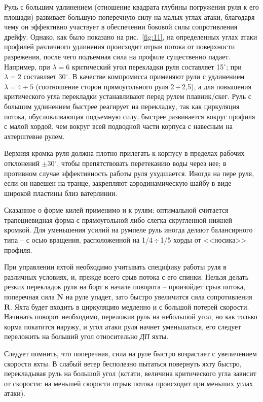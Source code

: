 \documentclass[a4paper, 12pt, twoside, final, book, russian, fittopage, cyremdash]{ncc}
\newcommand{\ve}[1]{\ensuremath{\mathbf{#1}}\xspace}
\newcommand{\gr}{\ensuremath{^\circ}\xspace}
\newcommand{\otdo}{\,\ensuremath{\div}\,}
\newcommand{\motdo}{\div}
\begin{document}
Руль с большим удлинением (отношение квадрата глубины погружения руля к его площади) развивает большую поперечную силу на малых углах атаки, благодаря чему он эффективно участвует в обеспечении боковой силы сопротивления дрейфу. Однако, как было показано на рис.~\ref{fig:11}, на определенных углах атаки профилей различного удлинения происходит отрыв потока от поверхности разрежения, после чего подъемная сила на профиле существенно падает. Например, при $\lambda = 6$ критический угол перекладки руля составляет 15\gr; при $\lambda = 2$ составляет 30\gr. В качестве компромисса применяют рули с удлинением $\lambda = 4 \motdo 5$ (соотношение сторон прямоугольного руля 2\otdo 2,5), а для повышения критического угла перекладки устанавливают перед рулем плавник\-/скег. Руль с большим удлинением быстрее реагирует на перекладку, так как циркуляция потока, обусловливающая подъемную силу, быстрее развивается вокруг профиля с малой хордой, чем вокруг всей подводной части корпуса с навесным на ахтерштевне рулем. 

Верхняя кромка руля должна плотно прилегать к корпусу в пределах рабочих отклонений $\pm 30\gr$, чтобы препятствовать перетеканию воды через нее; в противном случае эффективность работы руля ухудшается. Иногда на пере руля, если он навешен на транце, закрепляют аэродинамическую шайбу в виде широкой пластины близ ватерлинии.

Сказанное о форме килей применимо и к рулям: оптимальной считается трапециевидная форма с прямоугольной либо слегка скругленной нижней кромкой. Для уменьшения усилий на румпеле руль иногда делают балансирного типа \--- с осью вращения, расположенной на 1/4\otdo 1/5 хорды от <<носика>> профиля.

При управлении яхтой необходимо учитывать специфику работы руля в различных условиях, и, прежде всего срыв потока с его спинки. Нельзя делать резких перекладок руля на борт в начале поворота \--- произойдет срыв потока, поперечная сила \ve N на руле упадет, зато быстро увеличится сила сопротивления \ve R. Яхта будет входить в циркуляцию медленно и с большой потерей скорости. Начинать поворот необходимо, переложив руль на небольшой угол, но как только корма покатится наружу, и угол атаки руля начнет уменьшаться, его следует переложить на больший угол относительно \textit{ДП} яхты. 

Следует помнить, что поперечная, сила на руле быстро возрастает с увеличением скорости яхты. В слабый ветер бесполезно пытаться повернуть яхту быстро, перекладывая руль на большой угол (кстати, величина критического угла зависит от скорости: на меньшей скорости отрыв потока происходит при меньших углах атаки).
\end{document}
